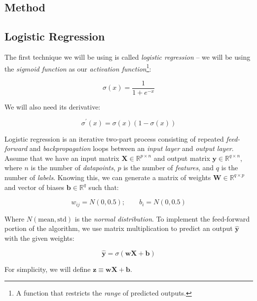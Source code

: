 \documentclass[a4paper,10pt,english]{article}
\begin{document}
\begin{multicols*}{2}
\section*{Method}

\subsection*{Logistic Regression}

The first technique we will be using is called \textit{logistic regression} – we will be using the \textit{sigmoid function} as our \textit{activation function}\footnote{A function that restricts the \textit{range} of predicted outputs.}:

\begin{equation}
\label{eq_sigmoid}
\sigma(x) = \frac{1}{1 + e^{-x}}
\end{equation}

We will also need its derivative:

\begin{equation}
\label{eq_diff_sigmoid}
\sigma^\prime(x) = \sigma(x) (1 - \sigma(x))
\end{equation}

Logistic regression is an iterative two-part process consisting of repeated \textit{feed-forward} and \textit{backpropagation} loops between an \textit{input layer} and \textit{output layer}.  Assume that we have an input matrix $\mathbf{X} \in \mathbb{R}^{p \times n}$ and output matrix $\mathbf{y} \in \mathbb{R}^{q \times n}$, where $n$ is the number of \textit{datapoints}, $p$ is the number of \textit{features}, and $q$ is the number of \textit{labels}.  Knowing this, we can generate a matrix of weights $\mathbf{W} \in \mathbb{R}^{q \times p}$ and vector of biases $\mathbf{b} \in \mathbb{R}^q$ such that:

\begin{equation*}
w_{ij} = N(0, 0.5); \qquad b_i = N(0, 0.5)
\end{equation*}

Where $N(\text{mean}, \text{std})$ is the \textit{normal distribution}.  To implement the feed-forward portion of the algorithm, we use matrix multiplication to predict an output $\hat{\mathbf{y}}$ with the given weights:

\begin{equation*}
\hat{\mathbf{y}} = \sigma( \mathbf{w} \mathbf{X} + \mathbf{b} )
\end{equation*}

For simplicity, we will define $\mathbf{z} \equiv \mathbf{w} \mathbf{X} + \mathbf{b}$.


\end{multicols*}
\end{document}
